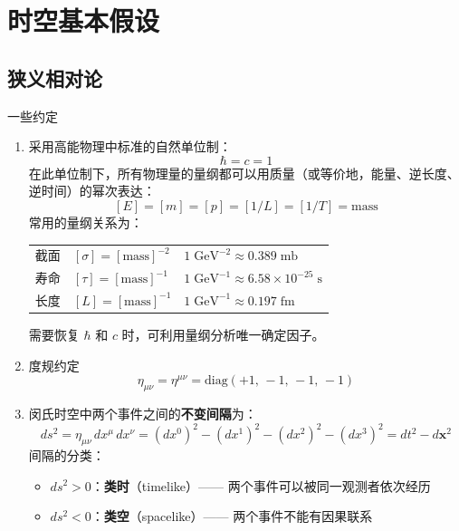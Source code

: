 \section{时空基本假设}
\subsection{狭义相对论}
一些约定
\begin{enumerate}
    \item  采用高能物理中标准的自然单位制：
      \begin{equation}\label{eq:natural-units}
        \hbar = c = 1
      \end{equation}
      在此单位制下，所有物理量的量纲都可以用质量（或等价地，能量、逆长度、逆时间）的幂次表达：
      \[
        [E] = [m] = [p] = [1/L] = [1/T] = \text{mass}
      \]
      常用的量纲关系为：
      \begin{center}
      \begin{tabular}{lll}
        截面 & $[\sigma] = [\text{mass}]^{-2}$ & $1\;\text{GeV}^{-2} \approx 0.389\;\text{mb}$ \\
        寿命 & $[\tau] = [\text{mass}]^{-1}$ & $1\;\text{GeV}^{-1} \approx 6.58\times10^{-25}\;\text{s}$ \\
        长度 & $[L] = [\text{mass}]^{-1}$   & $1\;\text{GeV}^{-1} \approx 0.197\;\text{fm}$
      \end{tabular}
      \end{center}
      需要恢复 $\hbar$ 和 $c$ 时，可利用量纲分析唯一确定因子。
    \item  度规约定
      \begin{equation}\label{eq:metric}
        \eta_{\mu\nu} = \eta^{\mu\nu}
        = \mathrm{diag}(+1,\,-1,\,-1,\,-1)
      \end{equation}
    \item 
        闵氏时空中两个事件之间的\textbf{不变间隔}为：
          \begin{equation}\label{eq:interval}
            ds^2 = \eta_{\mu\nu}\,dx^\mu\,dx^\nu
                = (dx^0)^2 - (dx^1)^2 - (dx^2)^2 - (dx^3)^2
                = dt^2 - d\mathbf{x}^2
          \end{equation}
          间隔的分类：
          \begin{itemize}
            \item $ds^2 > 0$：\textbf{类时}（timelike）——
                  两个事件可以被同一观测者依次经历
            \item $ds^2 < 0$：\textbf{类空}（spacelike）——
                  两个事件不能有因果联系

\end{itemize}
\end{enumerate}
